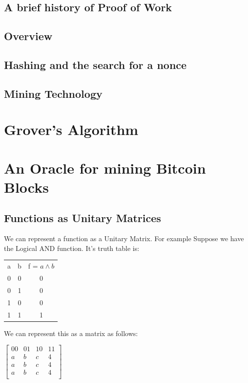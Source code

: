 \documentclass[11pt]{article} %
\begin{document}
\subsection{A brief history of Proof of Work}
\subsection{Overview}
\subsection{Hashing and the search for a nonce}
\subsection{Mining Technology}


\section{Grover's Algorithm}{}


\section{An Oracle for mining Bitcoin Blocks}{}

\subsection{Functions as Unitary Matrices}{}
We can represent a function as a Unitary Matrix. For example Suppose we have the Logical AND function. It's truth table is:

\begin{center}
\begin{tabular}{ |c|c|c| } 
 \hline
 a & b & f = $a \land b$ \\ 
 0 & 0 & 0 \\ 
 0 & 1 & 0 \\ 
 1 & 0 & 0 \\ 
 1 & 1 & 1 \\ 
 \hline
\end{tabular}
\end{center}

We can represent this as a matrix as follows:

$
\begin{bmatrix}
00 & 01 & 10 & 11\\
a & b & c & 4\\
a & b & c & 4\\
a & b & c & 4\\
\end{bmatrix}
$
\end{document}
